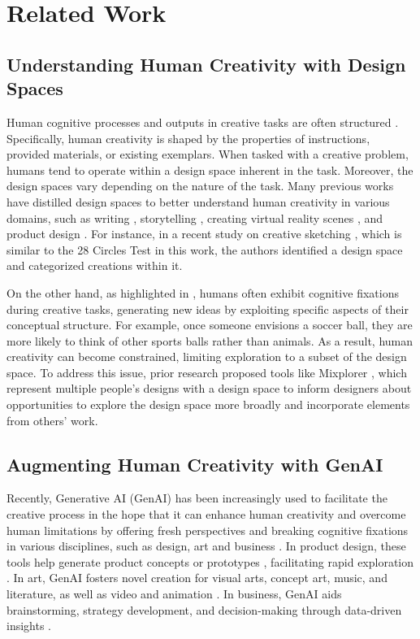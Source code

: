 \section{Related Work}

\subsection{Understanding Human Creativity with Design Spaces}

Human cognitive processes and outputs in creative tasks are often structured \cite{ward1994structured}. Specifically, human creativity is shaped by the properties of instructions, provided materials, or existing exemplars. When tasked with a creative problem, humans tend to operate within a design space inherent in the task. Moreover, the design spaces vary depending on the nature of the task. Many previous works have distilled design spaces to better understand human creativity in various domains, such as writing \cite{lee2024design}, storytelling \cite{fan2024storyprompt}, creating virtual reality scenes \cite{neuhaus2024virtual}, and product design \cite{lupetti2024making}. For instance, in a recent study on creative sketching \cite{williford2023exploring}, which is similar to the 28 Circles Test in this work, the authors identified a design space and categorized creations within it.

On the other hand, as highlighted in \cite{finke1996creative,jansson1991design}, humans often exhibit cognitive fixations during creative tasks, generating new ideas by exploiting specific aspects of their conceptual structure. For example, once someone envisions a soccer ball, they are more likely to think of other sports balls rather than animals. As a result, human creativity can become constrained, limiting exploration to a subset of the design space. To address this issue, prior research proposed tools like Mixplorer \cite{kim2022mixplorer}, which represent multiple people's designs with a design space to inform designers about opportunities to explore the design space more broadly and incorporate elements from others' work. 

\subsection{Augmenting Human Creativity with GenAI}

Recently, Generative AI (GenAI) has been increasingly used to facilitate the creative process in the hope that it can enhance human creativity and overcome human limitations by offering fresh perspectives and breaking cognitive fixations in various disciplines, such as design, art and business . In product design, these tools help generate product concepts or prototypes \cite{lu2024generative,duan2024conceptvis,zhang2024protodreamer}, facilitating rapid exploration \cite{kwon2024designer}. In art, GenAI fosters novel creation for visual arts, concept art, music, and literature, as well as video and animation \cite{epstein2023art,liu2024dreamscaping,shi2023understanding}. In business, GenAI aids brainstorming, strategy development, and decision-making through data-driven insights \cite{nguyen2023generative}.

